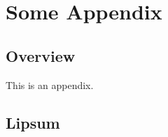 \chapter{Some Appendix}

\section{Overview}

This is an appendix.

\section{Lipsum}

\lipsum
\lipsum
\lipsum
\lipsum
